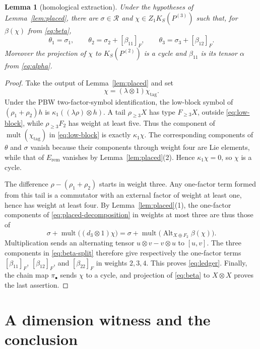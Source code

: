 \documentclass[11pt]{amsart}
\newtheorem{lemma}[theorem]{Lemma}
\newcommand{\Rel}{\mathcal R}
\newcommand{\Alt}{\operatorname{Alt}}
\begin{document}
\begin{lemma}[homological extraction]\label{lem:extraction}
Under the hypotheses of Lemma~\ref{lem:placed}, there are
$\sigma\in\Rel$ and $\chi\in Z_1K_S(P^{(3)})$ such that, for
$\beta(\chi)$ from \eqref{eq:beta},
\begin{equation}\label{eq:ledger}
 \theta_1=\sigma_1,
 \qquad
 \theta_2=\sigma_2+[\beta_{11}]_F,
 \qquad
 \theta_3=\sigma_3+[\beta_{12}]_F.
\end{equation}
Moreover the projection of $\chi$ to $K_S(P^{(2)})$ is a cycle and
$\beta_{11}$ is its tensor $\alpha$ from \eqref{eq:alpha}.
\end{lemma}

\begin{proof}
Take the output of Lemma~\ref{lem:placed} and set
\[
                     \chi=(\lambda\otimes1)\chi_{\mathrm{tag}}.
\]
Under the PBW two-factor-symbol identification, the low-block symbol
of $(\rho_1+\rho_2)h$ is
$\kappa_1((\lambda\rho)\otimes h)$.  A tail
$\rho_{\geq3}X$ has type $F_{\geq3}X$, outside
\eqref{eq:low-block}, while $\rho_{\geq3}F_2$ has weight at least
five.  Thus the component of
$\operatorname{mult}(\chi_{\mathrm{tag}})$ in
\eqref{eq:low-block} is exactly $\kappa_1\chi$.  The corresponding
components of $\theta$ and $\sigma$ vanish because their components
through weight four are Lie elements, while that of $E_{\mathrm{rem}}$
vanishes by Lemma~\ref{lem:placed}(2).  Hence $\kappa_1\chi=0$, so
$\chi$ is a cycle.

The difference $\rho-(\rho_1+\rho_2)$ starts in weight three.  Any
one-factor term formed from this tail is a commutator with an external
factor of weight at least one, hence has weight at least four.  By
Lemma~\ref{lem:placed}(1), the one-factor components of
\eqref{eq:placed-decomposition} in weights at most three are thus
those of
\[
 \sigma+\operatorname{mult}\bigl((d_3\otimes1)\chi\bigr)
 =\sigma+\operatorname{mult}\bigl(\Alt_{X\oplus F_2}\beta(\chi)\bigr).
\]
Multiplication sends an alternating tensor $u\otimes v-v\otimes u$
to $[u,v]$.  The three components in \eqref{eq:beta-split} therefore
give respectively the one-factor terms
$[\beta_{11}]_F$, $[\beta_{12}]_F$, and $[\beta_{22}]_F$ in weights
$2,3,4$.  This proves \eqref{eq:ledger}.  Finally, the chain map
$\pi_\bullet$ sends $\chi$ to a cycle, and projection of
\eqref{eq:beta} to $X\otimes X$ proves the last assertion.
\end{proof}

\section{A dimension witness and the conclusion}
\end{document}
